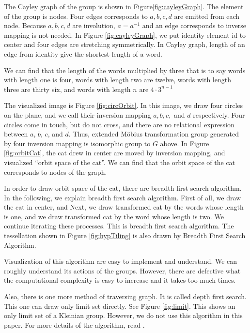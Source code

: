 The Cayley graph of the group is shown in Figure\ref{fig:cayleyGraph}.
The element of the group is nodes. Four edges corresponds to 
$a, b, c, d$ are emitted from each node.
Because $a, b, c, d$ are involution, $a=a^{-1}$ and
an edge corresponds to inverse mapping is not needed.
In Figure \ref{fig:cayleyGraph}, we put identity element $\mathrm{id}$
to center and four edges are stretching symmetrically.
In Cayley graph, length of an edge from identity give the shortest
length of a word.

We can find that the length of the words multiplied by three
that is to say words with length one is four, words with length two are
twelve, words with length three are thirty six, and words with length
$n$ are $4 \cdot 3^{n-1}$

The visualized image is Figure \ref{fig:circOrbit}. In this image,
we draw four circles on the plane, and we call their inversion mapping
$a, b, c,$ and $ d$ respectively. Four circles come in touch, but do not cross,
and there are no relational expression between $a$, $b$, $c$, and $d$.
Thus, extended M\"obius transformation group generated by four inversion
mapping is isomorphic group to $G$ above.
In Figure \ref{fig:orbitCat}, the cat drew in center are moved by
inversion mapping, and visualized ``orbit space of the cat''.
We can find that the orbit space of the cat corresponds to nodes of
the graph.

In order to draw orbit space of the cat, there are breadth first search
algorithm.
In the following, we explain breadth first search algorithm.
First of all, we draw the cat in center, and
Next, we draw transformed cat by the words whose length is one,
and we draw transformed cat by the word whose length is two.
We continue iterating these processes.
This is breadth first search algorithm.
The tessellation shown in Figure \ref{fig:hypTiling} is also drawn by
Breadth First Search Algorithm.

Visualization of this algorithm are easy to implement and understand.
We can roughly understand its actions of the groups.
However, there are defective what the computational complexity is 
easy to increase and it takes too much times.

Also, there is one more method of traversing graph.
It is called depth first search.
This one can draw only limit set directly.
See Figure \ref{fig:limit}. This shows an only limit set of a Kleinian
group.
However, we do not use this algorithm in this paper.
For more details of the algorithm, read \cite{MumfordSeriesWright200204}.

